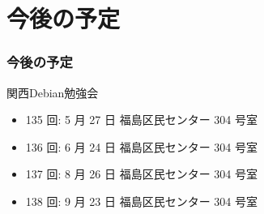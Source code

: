 \documentclass[cjk,dvipdfmx,10pt,compress,%
hyperref={bookmarks=true,bookmarksnumbered=true,bookmarksopen=false,%
colorlinks=false,%
pdftitle={第 132 回 関西 Debian 勉強会},%
pdfauthor={かわだ},%
pdfsubject={資料},%
}]{beamer}
\begin{document}
\section{今後の予定}
\begin{frame}[fragile]
  \frametitle{今後の予定}

  \begin{block}{関西Debian勉強会}
    \begin{itemize}
	\item {135 回: 5 月 27 日 福島区民センター 304 号室} 
	\item {136 回: 6 月 24 日 福島区民センター 304 号室} 
	\item {137 回: 8 月 26 日 福島区民センター 304 号室} 
	\item {138 回: 9 月 23 日 福島区民センター 304 号室} 
    \end{itemize}
  \end{block}

\end{frame}

\takahashi[50]{  }
\end{document}
